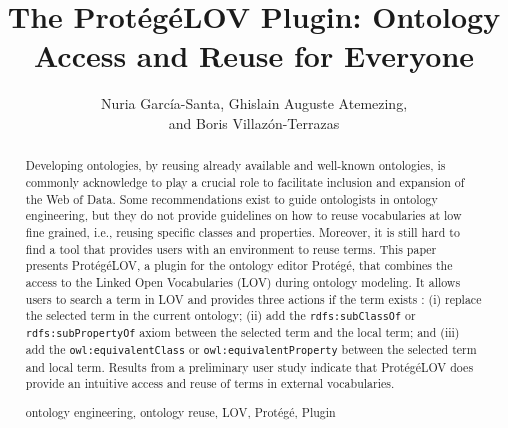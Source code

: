 \documentclass[runningheads,a4paper]{llncs}
\newcommand{\keywords}[1]{\par\addvspace\baselineskip
\noindent\keywordname\enspace\ignorespaces#1}
\begin{document}

\title{The Prot{\'e}g{\'e}LOV Plugin: Ontology Access and Reuse for Everyone }


\author{ Nuria Garc\'ia-Santa, Ghislain Auguste Atemezing,\\ and Boris Villaz{\'o}n-Terrazas}


\maketitle


\begin{abstract}
Developing ontologies, by reusing already available and well-known ontologies, is commonly acknowledge to play a crucial role to facilitate inclusion and expansion of the Web of Data. Some recommendations exist to guide ontologists in ontology engineering, but they do not provide guidelines on how to reuse vocabularies at low fine grained, i.e., reusing specific classes and properties. Moreover, it is still hard to find a tool that provides users with an environment to reuse terms. This paper presents Prot{\'e}g{\'e}LOV, a plugin for the ontology editor Prot{\'e}g{\'e}, that combines the access to the Linked Open Vocabularies (LOV) during ontology modeling. It allows users to search a term in LOV and provides three actions if the term exists : (i) replace the selected term in the current ontology; (ii) add the {\tt rdfs:subClassOf} or {\tt rdfs:subPropertyOf} axiom between the selected term and the local term; and (iii) add the {\tt owl:equivalentClass} or {\tt owl:equivalentProperty} between the selected term and local term. Results from a preliminary user study indicate that Prot{\'e}g{\'e}LOV does provide an intuitive access and reuse of terms in external vocabularies.
\keywords{ontology engineering, ontology reuse, LOV, Prot{\'e}g{\'e}, Plugin} 
\end{abstract}
\end{document}
